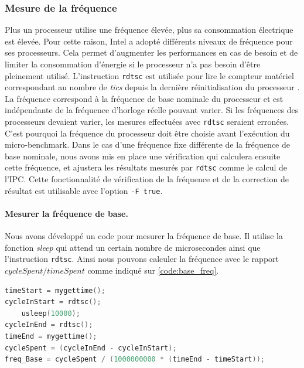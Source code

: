     \subsubsection{Mesure de la fréquence}
        Plus un processeur utilise une fréquence élevée, plus sa consommation électrique est élevée. Pour cette raison, Intel a adopté différents niveaux de fréquence pour ses processeurs. Cela permet d'augmenter les performances en cas de besoin et de limiter la consommation d'énergie si le processeur n'a pas besoin d'être pleinement utilisé. L'instruction \verb|rdtsc| est utilisée pour lire le compteur matériel correspondant au nombre de \textit{tics} depuis la dernière réinitialisation du processeur \cite{code:rdtsc}. La fréquence correspond à la fréquence de base nominale du processeur et est indépendante de la fréquence d'horloge réelle pouvant varier. Si les fréquences des processeurs devaient varier, les mesures effectuées avec \verb|rdtsc| seraient erronées. C'est pourquoi la fréquence du processeur doit être choisie avant l'exécution du micro-benchmark. Dans le cas d'une fréquence fixe différente de la fréquence de base nominale, nous avons mis en place une vérification qui calculera ensuite cette fréquence, et ajustera les résultats mesurés par \verb|rdtsc| comme le calcul de l'IPC. Cette fonctionnalité de vérification de la fréquence et de la correction de résultat est utilisable avec l'option \verb|-F true|. 
        
        \paragraph{Mesurer la fréquence de base.} Nous avons développé un code pour mesurer la fréquence de base. Il utilise la fonction \textit{sleep} qui attend un certain nombre de microsecondes ainsi que l'instruction \verb|rdtsc|. Ainsi nous pouvons calculer la fréquence avec le rapport $cycleSpent / timeSpent$ comme indiqué sur \autoref{code:base_freq}. 
        

\begin{lstlisting}[label=code:base_freq ,language=C, caption=Code used to measure the base frequency of the processor]
timeStart = mygettime();
cycleInStart = rdtsc();
    usleep(10000);
cycleInEnd = rdtsc();
timeEnd = mygettime();
cycleSpent = (cycleInEnd - cycleInStart);
freq_Base = cycleSpent / (1000000000 * (timeEnd - timeStart));
\end{lstlisting}        


